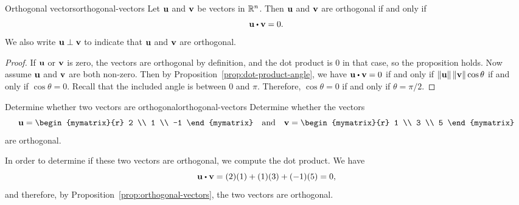 \begin{proposition}{Orthogonal vectors}{orthogonal-vectors}
  Let $\vect{u}$ and $\vect{v}$ be vectors in $\mathbb{R}^n$. Then $\vect{u}$
  and $\vect{v}$ are orthogonal if and only
  if
  \begin{equation*}
    \vect{u} \dotprod \vect{v} = 0.
  \end{equation*}
  We also write $\vect{u}\orth\vect{v}$ to indicate that $\vect{u}$
  and $\vect{v}$ are orthogonal.
\end{proposition}

\begin{proof}
  If $\vect{u}$ or $\vect{v}$ is zero, the vectors are orthogonal by
  definition, and the dot product is $0$ in that case, so the
  proposition holds. Now assume $\vect{u}$ and $\vect{v}$ are both
  non-zero.  Then by Proposition~\ref{prop:dot-product-angle}, we have
  $\vect{u} \dotprod \vect{v} = 0$ if and only if
  $\norm{\vect{u}} \norm{\vect{v}} \cos \theta$ if and only if
  $\cos\theta=0$. Recall that the included angle is between $0$ and
  $\pi$. Therefore, $\cos\theta=0$ if and only if $\theta=\pi/2$.
\end{proof}

\begin{example}{Determine whether two vectors are orthogonal}{orthogonal-vectors}
Determine whether the vectors
\begin{equation*}
\vect{u}=
\begin{mymatrix}{r}
2 \\
1 \\
-1
\end{mymatrix}
\quad\mbox{and}\quad
\vect{v}
=
\begin{mymatrix}{r}
1 \\
3 \\
5
\end{mymatrix}
\end{equation*}
are orthogonal.
\end{example}

\begin{solution}
  In order to determine if these two vectors are orthogonal, we
  compute the dot product. We have
  \begin{equation*}
    \vect{u} \dotprod \vect{v}
    =
    (2)(1) + (1)(3) + (-1)(5)
    =
    0,
  \end{equation*}
  and therefore, by Proposition~\ref{prop:orthogonal-vectors}, the two vectors are orthogonal.
\end{solution}
